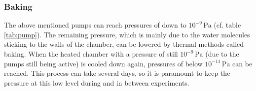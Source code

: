 \documentclass[a4paper]{scrartcl}
\numberwithin{equation}{section}
\numberwithin{figure}{section}
\numberwithin{table}{section}
\begin{document}
\subsubsection{Baking}
The above mentioned pumps can reach pressures of down to $10^{-9}\,\text{Pa}$ (cf. table \ref{tab:pump}). The remaining pressure, which is mainly due to the water molecules sticking to the walls of the chamber, can be lowered by thermal methods called baking. When the heated chamber with a pressure of still $10^{-9}\,\text{Pa}$ (due to the pumps still being active) is cooled down again, pressures of below $10^{-11}\,\text{Pa}$ can be reached. This process can take several days, so it is paramount to keep the pressure at this low level during and in between experiments.


\FloatBarrier
 

\end{document}
